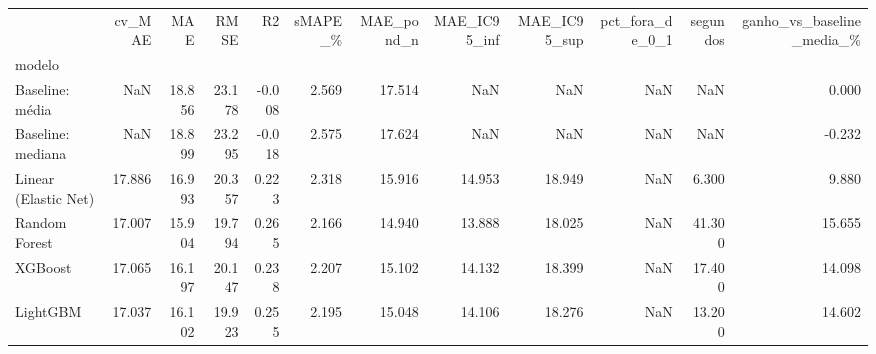 \begin{tabular}{lrrrrrrrrrrr}
\toprule
 & cv\_MAE & MAE & RMSE & R2 & sMAPE\_\% & MAE\_pond\_n & MAE\_IC95\_inf & MAE\_IC95\_sup & pct\_fora\_de\_0\_1 & segundos & ganho\_vs\_baseline\_media\_\% \\
modelo &  &  &  &  &  &  &  &  &  &  &  \\
\midrule
Baseline: média & NaN & 18.856 & 23.178 & -0.008 & 2.569 & 17.514 & NaN & NaN & NaN & NaN & 0.000 \\
Baseline: mediana & NaN & 18.899 & 23.295 & -0.018 & 2.575 & 17.624 & NaN & NaN & NaN & NaN & -0.232 \\
Linear (Elastic Net) & 17.886 & 16.993 & 20.357 & 0.223 & 2.318 & 15.916 & 14.953 & 18.949 & NaN & 6.300 & 9.880 \\
Random Forest & 17.007 & 15.904 & 19.794 & 0.265 & 2.166 & 14.940 & 13.888 & 18.025 & NaN & 41.300 & 15.655 \\
XGBoost & 17.065 & 16.197 & 20.147 & 0.238 & 2.207 & 15.102 & 14.132 & 18.399 & NaN & 17.400 & 14.098 \\
LightGBM & 17.037 & 16.102 & 19.923 & 0.255 & 2.195 & 15.048 & 14.106 & 18.276 & NaN & 13.200 & 14.602 \\
\bottomrule
\end{tabular}
